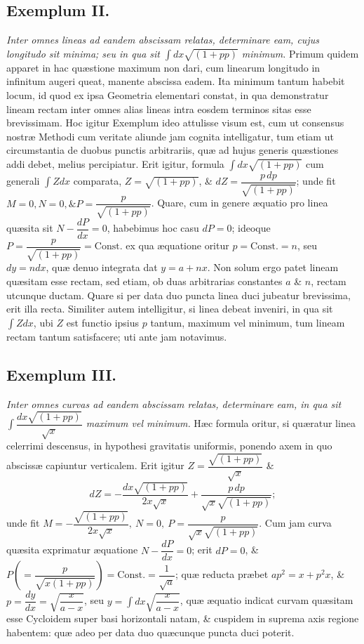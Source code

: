 \subsection*{Exemplum II.}
\textit{Inter omnes lineas ad eandem abscissam relatas, determinare eam, cujus longitudo sit minima; seu in qua sit $\int dx\sqrt{(1+pp)}$ minimum.}
Primum quidem apparet in hac quæstione maximum non dari, cum linearum longitudo in infinitum augeri queat, manente abscissa eadem. Ita minimum tantum habebit locum, id quod ex ipsa Geometria elementari constat, in qua demonstratur lineam rectam inter omnes alias lineas intra eosdem terminos sitas esse brevissimam. Hoc igitur Exemplum ideo attulisse visum est, cum ut consensus nostræ Methodi cum veritate aliunde jam cognita intelligatur, tum etiam ut circumstantia de duobus punctis arbitrariis, quæ ad hujus generis quæstiones addi debet, melius percipiatur. Erit igitur, formula $\int dx\sqrt{(1+pp)}$ cum generali $\int Zdx$ comparata, $Z=\sqrt{(1+pp)}$, \& $dZ=\dfrac{p\,dp}{\sqrt{(1+pp)}}$; unde fit $M=0,N=0,\&P=\dfrac{p}{\sqrt{(1+pp)}}$. Quare, cum in genere æquatio pro linea quæsita sit $N-\dfrac{dP}{dx}=0$, habebimus hoc casu $dP=0$; ideoque $P=\dfrac{p}{\sqrt{(1+pp)}}=\mathrm{Const.}$ ex qua æquatione oritur $p=\mathrm{Const.}=n$, seu $dy=ndx$, quæ denuo integrata dat $y=a+nx$. Non solum ergo patet lineam quæsitam esse rectam, sed etiam, ob duas arbitrarias constantes $a$ \& $n$, rectam utcunque ductam. Quare si per data duo puncta linea duci jubeatur brevissima, erit illa recta. Similiter autem intelligitur, si linea debeat inveniri, in qua sit $\int Zdx$, ubi $Z$ est functio ipsius $p$ tantum, maximum vel minimum, tum lineam rectam tantum satisfacere; uti ante jam notavimus.

\subsection*{Exemplum III.}
\textit{Inter omnes curvas ad eandem abscissam relatas, determinare eam, in qua sit $\int\dfrac{dx\sqrt{(1+pp)}}{\sqrt{x}}$ maximum vel minimum.}
Hæc formula oritur, si quæratur linea celerrimi descensus, in hypothesi gravitatis uniformis, ponendo axem in quo abscissæ capiuntur verticalem. Erit igitur $Z=\dfrac{\sqrt{(1+pp)}}{\sqrt{x}}$ \&
\[
dZ=-\frac{dx\sqrt{(1+pp)}}{2x\sqrt{x}}+\frac{p\,dp}{\sqrt{x}\sqrt{(1+pp)}};
\]
unde fit $M=-\dfrac{\sqrt{(1+pp)}}{2x\sqrt{x}},\ N=0,\ P=\dfrac{p}{\sqrt{x}\sqrt{(1+pp)}}$. Cum jam curva quæsita exprimatur æquatione $N-\dfrac{dP}{dx}=0$; erit $dP=0$, \& $P\left(=\dfrac{p}{\sqrt{x(1+pp)}}\right)=\mathrm{Const.}=\dfrac1{\sqrt a}$; quæ reducta præbet $ap^2=x+p^2x$, \& $p=\dfrac{dy}{dx}=\sqrt{\dfrac{x}{a-x}}$, seu $y=\int dx\sqrt{\dfrac{x}{a-x}}$, quæ æquatio indicat curvam quæsitam esse Cycloidem super basi horizontali natam, \& cuspidem in suprema axis regione habentem: quæ adeo per data duo quæcunque puncta duci poterit.

